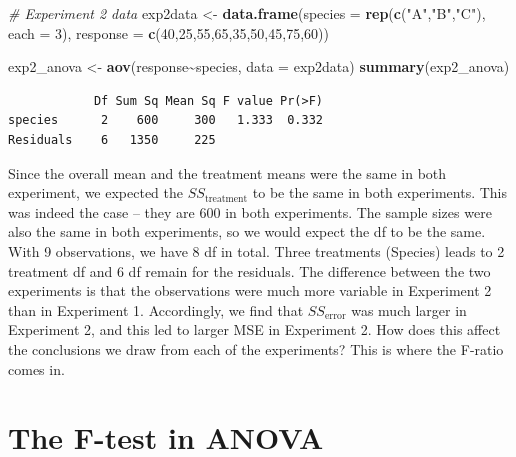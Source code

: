 \documentclass[
  letterpaper,
]{book}
\newenvironment{Shaded}{\begin{snugshade}}{\end{snugshade}}
\newcommand{\AttributeTok}[1]{\textcolor[rgb]{0.13,0.29,0.53}{#1}}
\newcommand{\CommentTok}[1]{\textcolor[rgb]{0.56,0.35,0.01}{\textit{#1}}}
\newcommand{\DecValTok}[1]{\textcolor[rgb]{0.00,0.00,0.81}{#1}}
\newcommand{\FunctionTok}[1]{\textcolor[rgb]{0.13,0.29,0.53}{\textbf{#1}}}
\newcommand{\NormalTok}[1]{#1}
\newcommand{\OtherTok}[1]{\textcolor[rgb]{0.56,0.35,0.01}{#1}}
\newcommand{\SpecialCharTok}[1]{\textcolor[rgb]{0.81,0.36,0.00}{\textbf{#1}}}
\newcommand{\StringTok}[1]{\textcolor[rgb]{0.31,0.60,0.02}{#1}}
\begin{document}
\begin{Shaded}
\begin{Highlighting}[]
\CommentTok{\# Experiment 2 data }
\NormalTok{exp2data }\OtherTok{\textless{}{-}} \FunctionTok{data.frame}\NormalTok{(}\AttributeTok{species =} \FunctionTok{rep}\NormalTok{(}\FunctionTok{c}\NormalTok{(}\StringTok{"A"}\NormalTok{,}\StringTok{"B"}\NormalTok{,}\StringTok{"C"}\NormalTok{), }\AttributeTok{each =} \DecValTok{3}\NormalTok{),}
                       \AttributeTok{response =} \FunctionTok{c}\NormalTok{(}\DecValTok{40}\NormalTok{,}\DecValTok{25}\NormalTok{,}\DecValTok{55}\NormalTok{,}\DecValTok{65}\NormalTok{,}\DecValTok{35}\NormalTok{,}\DecValTok{50}\NormalTok{,}\DecValTok{45}\NormalTok{,}\DecValTok{75}\NormalTok{,}\DecValTok{60}\NormalTok{))}

\NormalTok{exp2\_anova }\OtherTok{\textless{}{-}} \FunctionTok{aov}\NormalTok{(response}\SpecialCharTok{\textasciitilde{}}\NormalTok{species, }\AttributeTok{data =}\NormalTok{ exp2data)}
\FunctionTok{summary}\NormalTok{(exp2\_anova)}
\end{Highlighting}
\end{Shaded}

\begin{verbatim}
            Df Sum Sq Mean Sq F value Pr(>F)
species      2    600     300   1.333  0.332
Residuals    6   1350     225               
\end{verbatim}

Since the overall mean and the treatment means were the same in both
experiment, we expected the \(SS_{\text{treatment}}\) to be the same in
both experiments. This was indeed the case -- they are 600 in both
experiments. The sample sizes were also the same in both experiments, so
we would expect the df to be the same. With 9 observations, we have 8 df
in total. Three treatments (Species) leads to 2 treatment df and 6 df
remain for the residuals. The difference between the two experiments is
that the observations were much more variable in Experiment 2 than in
Experiment 1. Accordingly, we find that \(SS_{\text{error}}\) was much
larger in Experiment 2, and this led to larger MSE in Experiment 2. How
does this affect the conclusions we draw from each of the experiments?
This is where the F-ratio comes in.

\section{The F-test in ANOVA}\label{the-f-test-in-anova}
\end{document}
